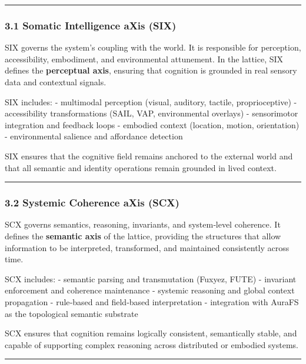 \begin{center}\rule{0.5\linewidth}{0.5pt}\end{center}

\subsubsection{3.1 Somatic Intelligence aXis (SIX)}\label{sensorimotor-integration-axis-six}

SIX governs the system's coupling with the world. It is responsible for perception, accessibility, embodiment, and environmental attunement. In the lattice, SIX defines the \textbf{perceptual axis}, ensuring that cognition is grounded in real sensory data and contextual signals.

SIX includes: - multimodal perception (visual, auditory, tactile, proprioceptive) - accessibility transformations (SAIL, VAP, environmental overlays) - sensorimotor integration and feedback loops - embodied context (location, motion, orientation) - environmental salience and affordance detection

SIX ensures that the cognitive field remains anchored to the external world and that all semantic and identity operations remain grounded in lived context.

\begin{center}\rule{0.5\linewidth}{0.5pt}\end{center}

\subsubsection{3.2 Systemic Coherence aXis (SCX)}\label{systemic-coherence-axis-scx}

SCX governs semantics, reasoning, invariants, and system‑level coherence. It defines the \textbf{semantic axis} of the lattice, providing the structures that allow information to be interpreted, transformed, and maintained consistently across time.

SCX includes: - semantic parsing and transmutation (Fuxyez, FUTE) - invariant enforcement and coherence maintenance - systemic reasoning and global context propagation - rule‑based and field‑based interpretation - integration with AuraFS as the topological semantic substrate

SCX ensures that cognition remains logically consistent, semantically stable, and capable of supporting complex reasoning across distributed or embodied systems.

\begin{center}\rule{0.5\linewidth}{0.5pt}\end{center}

